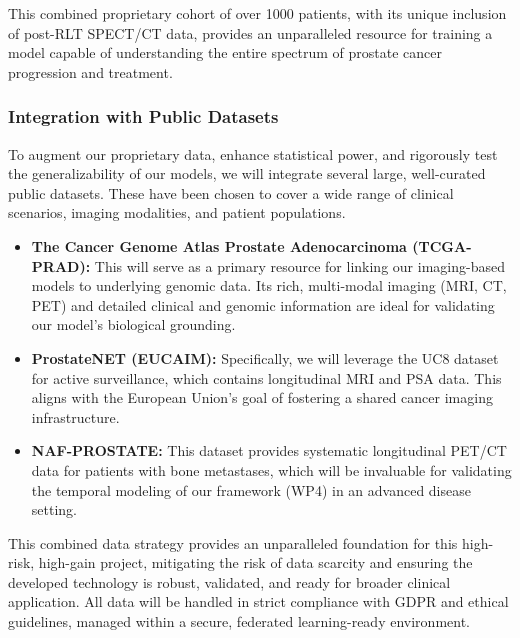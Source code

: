 \documentclass[11pt, a4paper]{article}
\begin{document}
This combined proprietary cohort of over 1000 patients, with its unique inclusion of post-RLT SPECT/CT data, provides an unparalleled resource for training a model capable of understanding the entire spectrum of prostate cancer progression and treatment.

\subsubsection{Integration with Public Datasets}
To augment our proprietary data, enhance statistical power, and rigorously test the generalizability of our models, we will integrate several large, well-curated public datasets. These have been chosen to cover a wide range of clinical scenarios, imaging modalities, and patient populations.
\begin{itemize}
    \item \textbf{The Cancer Genome Atlas Prostate Adenocarcinoma (TCGA-PRAD):} This will serve as a primary resource for linking our imaging-based models to underlying genomic data. Its rich, multi-modal imaging (MRI, CT, PET) and detailed clinical and genomic information are ideal for validating our model’s biological grounding.
    \item \textbf{ProstateNET (EUCAIM):} Specifically, we will leverage the UC8 dataset for active surveillance, which contains longitudinal MRI and PSA data. This aligns with the European Union’s goal of fostering a shared cancer imaging infrastructure.
    \item \textbf{NAF-PROSTATE:} This dataset provides systematic longitudinal PET/CT data for patients with bone metastases, which will be invaluable for validating the temporal modeling of our framework (WP4) in an advanced disease setting.
\end{itemize}
This combined data strategy provides an unparalleled foundation for this high-risk, high-gain project, mitigating the risk of data scarcity and ensuring the developed technology is robust, validated, and ready for broader clinical application. All data will be handled in strict compliance with GDPR and ethical guidelines, managed within a secure, federated learning-ready environment.
\end{document}
